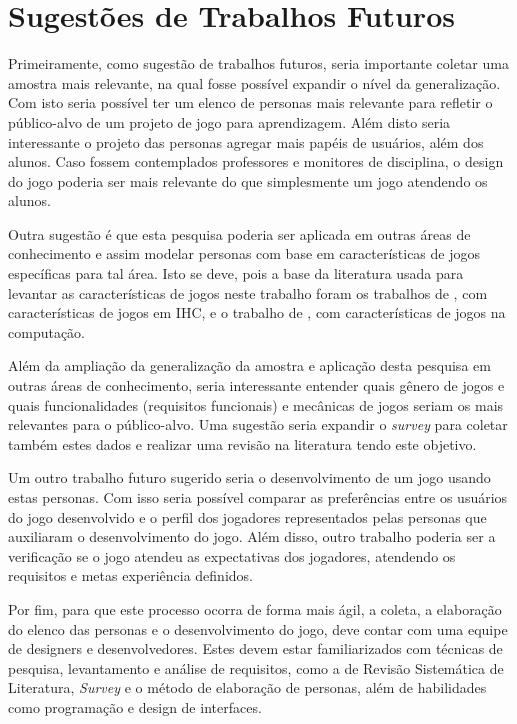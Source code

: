 \section{Sugestões de Trabalhos Futuros}

Primeiramente, como sugestão de trabalhos futuros, seria importante coletar uma amostra mais relevante, na qual fosse possível expandir o nível da generalização. Com isto seria possível ter um elenco de personas mais relevante para refletir o público-alvo de um projeto de jogo para aprendizagem. Além disto seria interessante o projeto das personas agregar mais papéis de usuários, além dos alunos. Caso fossem contemplados professores e monitores de disciplina, o design do jogo poderia ser mais relevante do que simplesmente um jogo atendendo os alunos. 

Outra sugestão é que esta pesquisa poderia ser aplicada em outras áreas de conhecimento e assim modelar personas com base em características de jogos específicas para tal área. Isto se deve, pois a base da literatura usada para levantar as características de jogos neste trabalho foram os trabalhos de , com características de jogos em IHC, e o trabalho de , com características de jogos na computação.

Além da ampliação da generalização da amostra e aplicação desta pesquisa em outras áreas de conhecimento, seria interessante entender quais gênero de jogos e quais funcionalidades (requisitos funcionais) e mecânicas de jogos seriam os mais relevantes para o público-alvo. Uma sugestão seria expandir o \textit{survey} para coletar também estes dados e realizar uma revisão na literatura tendo este objetivo.

Um outro trabalho futuro sugerido seria o desenvolvimento de um jogo usando estas personas. Com isso seria possível comparar as preferências entre os usuários do jogo desenvolvido e o perfil dos jogadores representados pelas personas que auxiliaram o desenvolvimento do jogo. Além disso, outro trabalho poderia ser a verificação se o jogo atendeu as expectativas dos jogadores, atendendo os requisitos e metas experiência definidos. 

Por fim, para que este processo ocorra de forma mais ágil, a coleta, a elaboração do elenco das personas e o desenvolvimento do jogo, deve contar com uma equipe de designers e desenvolvedores. Estes devem estar familiarizados com técnicas de pesquisa, levantamento e análise de requisitos, como a de Revisão Sistemática de Literatura, \textit{Survey} e o método de elaboração de personas, além de habilidades como programação e design de interfaces.
